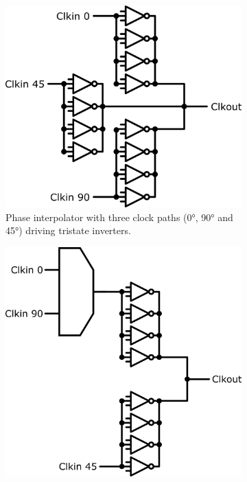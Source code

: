 \begin{figure}[H]
  \centering
  \hfill
  \begin{subfigure}[t]{0.3\linewidth}
    \centering
    \includegraphics[width=\linewidth]{figures/Schematics/PhaseInterpolator_3paths.png}
    \caption{Phase interpolator with three clock paths (\ang{0}, \ang{90} and \ang{45}) driving tristate inverters.}
    \label{fig:phase_interpolator_3paths}
  \end{subfigure}%
  \hfill
  \begin{subfigure}[t]{0.3\linewidth}
    \centering
    \includegraphics[width=\linewidth]{figures/Schematics/PhaseInterpolator_2paths.png}

\end{subfigure}
\end{figure}
